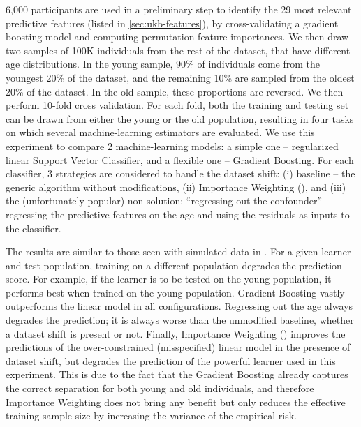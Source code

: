 \documentclass[twocolumn]{article}
\begin{document}
6,000 participants are used in a preliminary step to identify the 29 most relevant predictive features (listed in \cref{sec:ukb-features}), by cross-validating a gradient boosting model and computing permutation feature importances.
We then draw two samples of 100K individuals from the rest of the dataset, that have different age distributions.
In the young sample, 90\% of individuals come from the youngest 20\% of the dataset, and the remaining 10\% are sampled from  the oldest 20\% of the dataset.
In the old sample, these proportions are reversed.
We then perform 10-fold cross validation.
For each fold, both the training and testing set can be drawn from either the young or the old population, resulting in four tasks on which several machine-learning estimators are evaluated.
We use this experiment to compare 2 machine-learning models: a simple one -- regularized linear Support Vector Classifier, and a flexible one -- Gradient Boosting.
For each classifier, 3 strategies are considered to handle the dataset shift: (i) baseline -- the generic algorithm without modifications, (ii) Importance Weighting (), and (iii) the (unfortunately popular) non-solution: ``regressing out the confounder'' -- regressing the predictive features on the age and using the residuals as inputs to the classifier.

The results are similar to those seen with simulated data in .
For a given learner and test population, training on a different population degrades the prediction score.
For example, if the learner is to be tested on the young population, it performs best when trained on the young population.
Gradient Boosting vastly outperforms the linear model in all configurations.
Regressing out the age always degrades the prediction; it is always worse than the unmodified baseline, whether a dataset shift is present or not.
Finally, Importance Weighting () improves the predictions of the
over-constrained (misspecified) linear model in the presence of dataset shift, but degrades the prediction of the powerful learner used in this experiment.
This is due to the fact that the Gradient Boosting already captures the correct separation for both young and old individuals, and therefore Importance Weighting does not bring any benefit but only reduces the effective training sample size by increasing the variance of the empirical risk.
\end{document}
